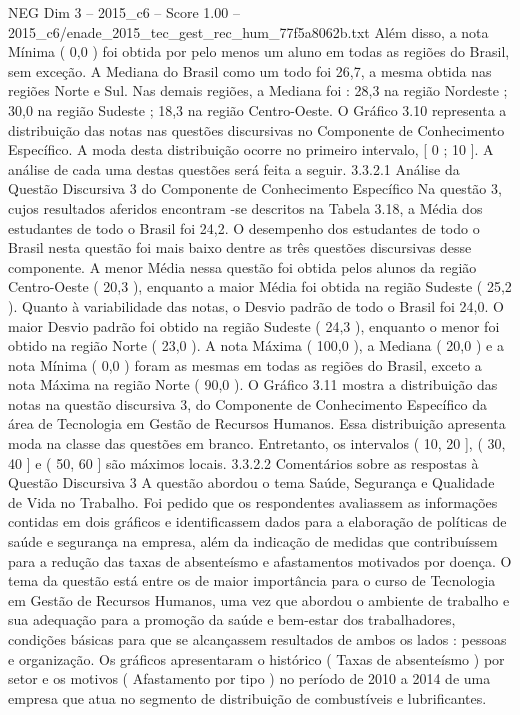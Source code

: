 \begin{textsample}{NEG Dim 3 – 2015\_c6 – Score 1.00 – 2015\_c6/enade\_2015\_tec\_gest\_rec\_hum\_77f5a8062b.txt}
Além disso, a nota Mínima ( 0,0 ) foi obtida por pelo menos um aluno em todas as regiões do Brasil, sem exceção.
A Mediana do Brasil como um todo foi 26,7, a mesma obtida nas regiões Norte e Sul.
Nas demais regiões, a Mediana foi : 28,3 na região Nordeste ; 30,0 na região Sudeste ; 18,3 na região Centro-Oeste.
O Gráfico 3.10 representa a distribuição das notas nas questões discursivas no Componente de Conhecimento Específico.
A moda desta distribuição ocorre no primeiro intervalo, [ 0 ; 10 ].
A análise de cada uma destas questões será feita a seguir. 3.3.2.1 Análise da Questão Discursiva 3 do Componente de Conhecimento Específico Na questão 3, cujos resultados aferidos encontram -se descritos na Tabela 3.18, a Média dos estudantes de todo o Brasil foi 24,2.
O desempenho dos estudantes de todo o Brasil nesta questão foi mais baixo dentre as três questões discursivas desse componente.
A menor Média nessa questão foi obtida pelos alunos da região Centro-Oeste ( 20,3 ), enquanto a maior Média foi obtida na região Sudeste ( 25,2 ).
Quanto à variabilidade das notas, o Desvio padrão de todo o Brasil foi 24,0.
O maior Desvio padrão foi obtido na região Sudeste ( 24,3 ), enquanto o menor foi obtido na região Norte ( 23,0 ).
A nota Máxima ( 100,0 ), a Mediana ( 20,0 ) e a nota Mínima ( 0,0 ) foram as mesmas em todas as regiões do Brasil, exceto a nota Máxima na região Norte ( 90,0 ).
O Gráfico 3.11 mostra a distribuição das notas na questão discursiva 3, do Componente de Conhecimento Específico da área de Tecnologia em Gestão de Recursos Humanos.
Essa distribuição apresenta moda na classe das questões em branco.
Entretanto, os intervalos ( 10, 20 ], ( 30, 40 ] e ( 50, 60 ] são máximos locais. 3.3.2.2 Comentários sobre as respostas à Questão Discursiva 3 A questão abordou o tema Saúde, Segurança e Qualidade de Vida no Trabalho.
Foi pedido que os respondentes avaliassem as informações contidas em dois gráficos e identificassem dados para a elaboração de políticas de saúde e segurança na empresa, além da indicação de medidas que contribuíssem para a redução das taxas de absenteísmo e afastamentos motivados por doença.
O tema da questão está entre os de maior importância para o curso de Tecnologia em Gestão de Recursos Humanos, uma vez que abordou o ambiente de trabalho e sua adequação para a promoção da saúde e bem-estar dos trabalhadores, condições básicas para que se alcançassem resultados de ambos os lados : pessoas e organização.
Os gráficos apresentaram o histórico ( Taxas de absenteísmo ) por setor e os motivos ( Afastamento por tipo ) no período de 2010 a 2014 de uma empresa que atua no segmento de distribuição de combustíveis e lubrificantes.

\end{textsample}
